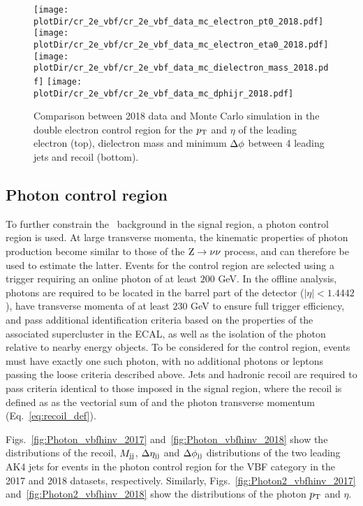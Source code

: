 \begin{figure}[htbp]
    \begin{center}
        \texttt{[image: \\plotDir/cr\_2e\_vbf/cr\_2e\_vbf\_data\_mc\_electron\_pt0\_2018.pdf]}
        \texttt{[image: \\plotDir/cr\_2e\_vbf/cr\_2e\_vbf\_data\_mc\_electron\_eta0\_2018.pdf]}
        \texttt{[image: \\plotDir/cr\_2e\_vbf/cr\_2e\_vbf\_data\_mc\_dielectron\_mass\_2018.pdf]}
        \texttt{[image: \\plotDir/cr\_2e\_vbf/cr\_2e\_vbf\_data\_mc\_dphijr\_2018.pdf]}
    \end{center}
    \caption{Comparison between 2018 data and Monte Carlo simulation in the double electron control region for
        the $p_{\textrm{T}}$ and $\eta$ of the leading electron (top), dielectron mass and minimum $\Delta \phi$ between 4 leading jets and recoil (bottom).}
    \label{fig:cr_2e_vbf_2018_mtr_2}
\end{figure}

\clearpage

\subsection{Photon control region}
\label{sec:selection_cr_g}

To further constrain the \Zvv \ background in the signal region, a photon control region is used.
At large transverse momenta, the kinematic properties of photon production become similar to those of the $\mathrm{Z}\to\nu\nu$ process, 
and can therefore be used to estimate the latter. Events for the control region are selected using a trigger requiring 
an online photon \pt of at least $200$ GeV. In the offline analysis, photons are required to be located in the barrel 
part of the detector ($|\eta|<1.4442$), have transverse momenta of at least $230$ GeV to ensure full trigger efficiency, 
and pass additional identification criteria based on the properties of the associated supercluster in the ECAL, 
as well as the isolation of the photon relative to nearby energy objects. To be considered for the control region, 
events must have exactly one such photon, with no additional photons or leptons passing the loose criteria described above. 
Jets and hadronic recoil are required to pass criteria identical to those imposed in the signal region, where the recoil 
is defined as as the vectorial sum of \ptvecmiss and the photon transverse momentum (Eq.~\ref{eq:recoil_def}).

Figs.~\ref{fig:Photon_vbfhinv_2017} and~\ref{fig:Photon_vbfhinv_2018} show the distributions of the recoil, $M_{\textrm{jj}}$, $\Delta \eta_{\textrm{jj}}$ and 
$\Delta \phi_{\textrm{jj}}$ distributions of the two leading AK4 jets for events in the photon control region for the VBF category in the 
2017 and 2018 datasets, respectively. Similarly, Figs.~\ref{fig:Photon2_vbfhinv_2017} and~\ref{fig:Photon2_vbfhinv_2018} 
show the distributions of the photon $p_{\textrm{T}}$ and $\eta$.

